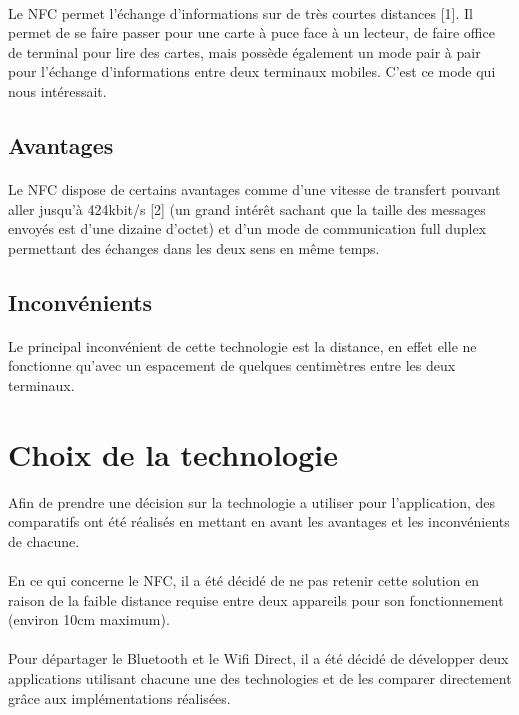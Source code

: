 \documentclass[a4paper,10pt]{report}
\begin{document}
     \paragraph{}
     Le NFC permet l'échange d'informations sur de très courtes distances [1]. Il permet de se faire passer pour une carte à puce face à un lecteur, de faire office de terminal pour lire des cartes, mais possède également un mode pair à pair pour l'échange d'informations entre deux terminaux mobiles. C'est ce mode qui nous intéressait.
    \subsection{Avantages}
    \paragraph{}
    Le NFC dispose de certains avantages comme d'une vitesse de transfert pouvant aller jusqu'à 424kbit/s [2] (un grand intérêt sachant que la taille des messages envoyés est d'une dizaine d'octet) et d'un mode de communication full duplex permettant des échanges dans les deux sens en même temps.
    \subsection{Inconvénients}
    \paragraph{}
    Le principal inconvénient de cette technologie est la distance, en effet elle ne fonctionne qu'avec un espacement de quelques centimètres entre les deux terminaux.
  \section{Choix de la technologie}
  
  Afin de prendre une décision sur la technologie a utiliser pour l'application, des comparatifs ont été réalisés en mettant en avant les avantages et les inconvénients de chacune. 
  \paragraph{}
  En ce qui concerne le NFC, il a été décidé de ne pas retenir cette solution en raison de la faible distance requise entre deux appareils pour son fonctionnement (environ 10cm maximum).
  \paragraph{}
  Pour départager le Bluetooth et le Wifi Direct, il a été décidé de développer deux applications utilisant chacune une des technologies et de les comparer directement grâce aux implémentations réalisées.
\end{document}
